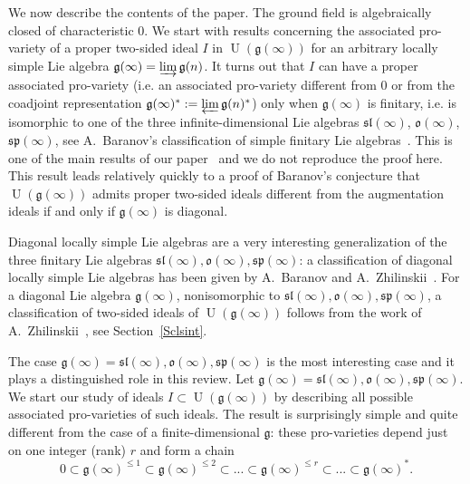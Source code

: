 \documentclass{emsprocart}
\begin{document}
We now describe the contents of the paper. The ground field is algebraically closed of characteristic 0. We start with results concerning the associated pro-variety of a proper two-sided ideal $I$ in $\operatorname{U}(\mathfrak g(\infty))$ for an arbitrary locally simple Lie algebra $\mathfrak g(\infty)=\varinjlim\mathfrak g(n)$.  It turns out that $I$ can have a proper associated pro-variety (i.e. an associated pro-variety different from 0 or from the coadjoint representation $\mathfrak g(\infty)^*:=\varprojlim \mathfrak g(n)^*$) only when $\mathfrak g(\infty)$ is finitary, i.e. is isomorphic to one of the three  infinite-dimensional Lie algebras $\mathfrak{sl}(\infty)$, $\mathfrak o(\infty)$, $\mathfrak{sp}(\infty)$, see A.~Baranov's classification of simple finitary Lie algebras~\cite{Ba2}. This is one of the main results of our paper~\cite{PP1} and we do not reproduce the proof here. This result leads relatively quickly to a proof of Baranov's conjecture that $\operatorname{U}(\mathfrak g(\infty))$ admits proper two-sided ideals different from the augmentation ideals if and only if $\mathfrak g(\infty)$ is diagonal.

Diagonal locally simple Lie algebras are a very interesting generalization of the three finitary Lie algebras $\mathfrak{sl}(\infty), \mathfrak o(\infty), \mathfrak{sp}(\infty)$: a classification of diagonal locally simple Lie algebras has been given by A.~Baranov and A.~Zhilinskii~\cite{BZh1}. For a diagonal Lie algebra $\mathfrak g(\infty)$, nonisomorphic to $\mathfrak{sl}(\infty), \mathfrak o(\infty), \mathfrak{sp}(\infty)$, a classification of two-sided ideals of $\operatorname{U}(\mathfrak g(\infty))$ follows from the work of A.~Zhilinskii~\cite{Zh3}, see Section~\ref{Sclsint}.


The case $\mathfrak g(\infty)=\mathfrak{sl}(\infty), \mathfrak{o}(\infty), \mathfrak{sp}(\infty)$ is the most interesting case and it plays a distinguished role in this review. Let $\mathfrak g(\infty)=\mathfrak{sl}(\infty), \mathfrak o(\infty), \mathfrak{sp}(\infty)$. We start our study of ideals $I\subset\operatorname{U}(\mathfrak g(\infty))$ by describing all possible associated pro-varieties of such ideals. The result is surprisingly simple and quite different from the case of a finite-dimensional $\mathfrak g$: these pro-varieties depend just on one integer (rank) $r$ and form a chain
$$0\subset\mathfrak g(\infty)^{\le 1}\subset\mathfrak g(\infty)^{\le 2}\subset...\subset\mathfrak g(\infty)^{\le r}\subset...\subset\mathfrak g(\infty)^*.$$
\end{document}
